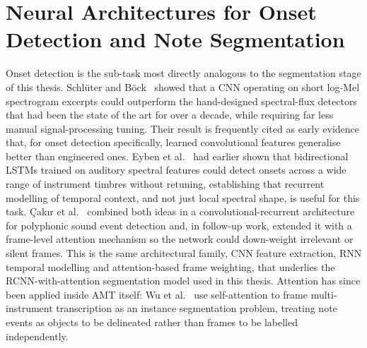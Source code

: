 \section{Neural Architectures for Onset Detection and Note Segmentation}
\label{sec:architectures}

Onset detection is the sub-task most directly analogous to the segmentation stage of this thesis. Schl\"{u}ter and B\"{o}ck~\cite{ref18} showed that a CNN operating on short log-Mel spectrogram excerpts could outperform the hand-designed spectral-flux detectors that had been the state of the art for over a decade, while requiring far less manual signal-processing tuning. Their result is frequently cited as early evidence that, for onset detection specifically, learned convolutional features generalise better than engineered ones. Eyben et al.~\cite{ref19} had earlier shown that bidirectional LSTMs trained on auditory spectral features could detect onsets across a wide range of instrument timbres without retuning, establishing that recurrent modelling of temporal context, and not just local spectral shape, is useful for this task. \c{C}ak{\i}r et al.~\cite{ref20} combined both ideas in a convolutional-recurrent architecture for polyphonic sound event detection and, in follow-up work, extended it with a frame-level attention mechanism so the network could down-weight irrelevant or silent frames. This is the same architectural family, CNN feature extraction, RNN temporal modelling and attention-based frame weighting, that underlies the RCNN-with-attention segmentation model used in this thesis. Attention has since been applied inside AMT itself: Wu et al.~\cite{ref21} use self-attention to frame multi-instrument transcription as an instance segmentation problem, treating note events as objects to be delineated rather than frames to be labelled independently.

